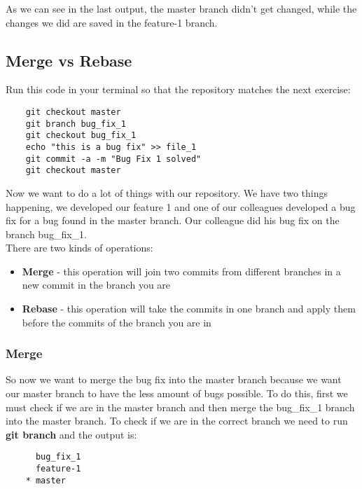 \documentclass{article}
\begin{document}
As we can see in the last output, the master branch didn't get changed, while the changes we did are saved in the feature-1 branch.\\

\subsection{Merge vs Rebase}

Run this code in your terminal so that the repository matches the next exercise:

\begin{lstlisting}
	git checkout master
	git branch bug_fix_1
	git checkout bug_fix_1
	echo "this is a bug fix" >> file_1
	git commit -a -m "Bug Fix 1 solved"
	git checkout master
\end{lstlisting}

Now we want to do a lot of things with our repository. We have two things happening, we developed our feature 1 and one of our colleagues developed a bug fix for a bug found in the master branch. Our colleague did his bug fix on the branch bug\_fix\_1.\\

There are two kinds of operations: 

\begin{itemize}
	\item{\textbf{Merge} - this operation will join two commits from different branches in a new commit in the branch you are}
	\item{\textbf{Rebase} - this operation will take the commits in one branch and apply them before the commits of the branch you are in}
\end{itemize}

\subsubsection{Merge}

So now we want to merge the bug fix into the master branch because we want our master branch to have the less amount of bugs possible. To do this, first we must check if we are in the master branch and then merge the bug\_fix\_1 branch into the master branch. To check if we are in the correct branch we need to run \textbf{git branch} and the output is:

\begin{lstlisting}
	  bug_fix_1
	  feature-1
	* master
\end{lstlisting}
\end{document}
